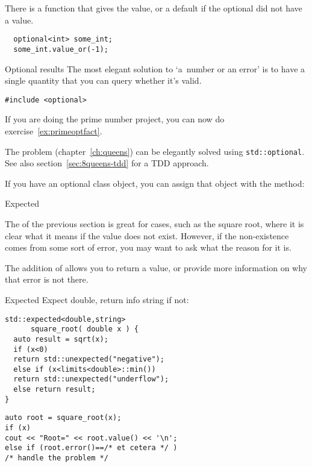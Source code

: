 There is a function  that gives the value, or
a default if the optional did not have a value.
\begin{lstlisting}
  optional<int> some_int;
  some_int.value_or(-1);
\end{lstlisting}

\begin{slide}{Optional results}
  \label{sl:optional-root}
  The most elegant solution to `a~number or an error' is to have a
  single quantity that you can query whether it's valid.
\begin{lstlisting}
#include <optional>
\end{lstlisting}
  \lstset{numbers=left,numberstyle=\tiny}
\end{slide}

\begin{exercise}
  If you are doing the prime number project,
  you can now do exercise~\ref{ex:primeoptfact}.
\end{exercise}

\begin{exercise}
  The  problem (chapter~\ref{ch:queens})
  can be elegantly solved using \lstinline+std::optional+.
  See also section~\ref{sec:8queens-tdd} for a \ac{TDD} approach.
\end{exercise}

\begin{remark}
  If you have an optional class object, you can assign that object
  with the  method:
\end{remark}

 {Expected}

The  of the previous section is great
for cases, such as the square root, where it is clear
what it means if the value does not exist.
However, if the non-existence comes from some sort of error,
you may want to ask what the reason for it is.

The  addition of 
allows you to return a value, or provide more information
on why that error is not there.
\begin{block}{Expected}
\label{sl:expected}
Expect double, return info string if not:
\begin{multicols}{2}
\begin{lstlisting}
std::expected<double,string> 
      square_root( double x ) {
  auto result = sqrt(x);
  if (x<0)
  return std::unexpected("negative");
  else if (x<limits<double>::min())
  return std::unexpected("underflow");
  else return result;
}
\end{lstlisting}
\columnbreak
\begin{lstlisting}
auto root = square_root(x);
if (x)
cout << "Root=" << root.value() << '\n';
else if (root.error()==/* et cetera */ )
/* handle the problem */
\end{lstlisting}
\end{multicols}
\end{block}

